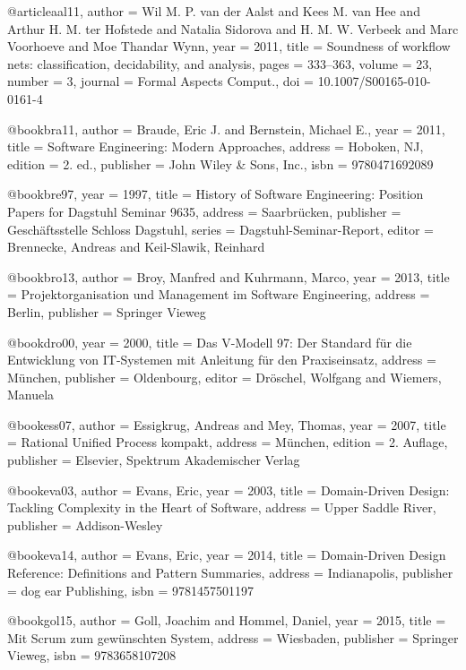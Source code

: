 @article{aal11,
 author = {Wil M. P. van der Aalst and
                  Kees M. van Hee and
                  Arthur H. M. ter Hofstede and
                  Natalia Sidorova and
                  H. M. W. Verbeek and
                  Marc Voorhoeve and
                  Moe Thandar Wynn},
 year = {2011},
 title = {Soundness of workflow nets: classification, decidability, and analysis},
 pages = {333--363},
 volume = {23},
 number = {3},
 journal = {Formal Aspects Comput.},
 doi = {10.1007/S00165-010-0161-4}
}


@book{bra11,
 author = {Braude, Eric J. and Bernstein, Michael E.},
 year = {2011},
 title = {Software Engineering: Modern Approaches},
 address = {Hoboken, NJ},
 edition = {2. ed.},
 publisher = {{John Wiley {\&} Sons, Inc.}},
 isbn = {9780471692089}
}


@book{bre97,
 year = {1997},
 title = {History of Software Engineering: Position Papers for Dagstuhl Seminar 9635},
 address = {Saarbr{\"u}cken},
 publisher = {{Gesch{\"a}ftsstelle Schloss Dagstuhl}},
 series = {Dagstuhl-Seminar-Report},
 editor = {Brennecke, Andreas and Keil-Slawik, Reinhard}
}


@book{bro13,
 author = {Broy, Manfred and Kuhrmann, Marco},
 year = {2013},
 title = {Projektorganisation und Management im Software Engineering},
 address = {Berlin},
 publisher = {{Springer Vieweg}}
}


@book{dro00,
 year = {2000},
 title = {Das V-Modell 97: Der Standard f{\"u}r die Entwicklung von IT-Systemen mit Anleitung f{\"u}r den Praxiseinsatz},
 address = {M{\"u}nchen},
 publisher = {Oldenbourg},
 editor = {Dr{\"o}schel, Wolfgang and Wiemers, Manuela}
}


@book{ess07,
 author = {Essigkrug, Andreas and Mey, Thomas},
 year = {2007},
 title = {Rational Unified Process kompakt},
 address = {M{\"u}nchen},
 edition = {2. Auflage},
 publisher = {{Elsevier, Spektrum Akademischer Verlag}}
}


@book{eva03,
 author = {Evans, Eric},
 year = {2003},
 title = {Domain-Driven Design: Tackling Complexity in the Heart of Software},
 address = {Upper Saddle River},
 publisher = {Addison-Wesley}
}


@book{eva14,
 author = {Evans, Eric},
 year = {2014},
 title = {Domain-Driven Design Reference: Definitions and Pattern Summaries},
 address = {Indianapolis},
 publisher = {{dog ear Publishing}},
 isbn = {9781457501197}
}


@book{gol15,
 author = {Goll, Joachim and Hommel, Daniel},
 year = {2015},
 title = {Mit Scrum zum gew{\"u}nschten System},
 address = {Wiesbaden},
 publisher = {{Springer Vieweg}},
 isbn = {9783658107208}
}


